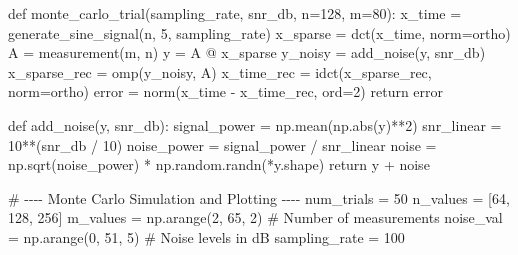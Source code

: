 \documentclass[
  letterpaper,
  DIV=11,
  numbers=noendperiod]{scrartcl}
\newenvironment{Shaded}{\begin{snugshade}}{\end{snugshade}}
\newcommand{\BuiltInTok}[1]{\textcolor[rgb]{0.40,0.85,0.94}{#1}}
\newcommand{\CommentTok}[1]{\textcolor[rgb]{0.46,0.44,0.37}{#1}}
\newcommand{\ControlFlowTok}[1]{\textcolor[rgb]{0.98,0.15,0.45}{#1}}
\newcommand{\DecValTok}[1]{\textcolor[rgb]{0.68,0.51,1.00}{#1}}
\newcommand{\KeywordTok}[1]{\textcolor[rgb]{0.98,0.15,0.45}{#1}}
\newcommand{\NormalTok}[1]{\textcolor[rgb]{0.97,0.97,0.95}{#1}}
\newcommand{\OperatorTok}[1]{\textcolor[rgb]{0.97,0.97,0.95}{#1}}
\newcommand{\StringTok}[1]{\textcolor[rgb]{0.90,0.86,0.45}{#1}}
\begin{document}
\begin{Shaded}
\begin{Highlighting}[]
\KeywordTok{def}\NormalTok{ monte\_carlo\_trial(sampling\_rate, snr\_db, n}\OperatorTok{=}\DecValTok{128}\NormalTok{, m}\OperatorTok{=}\DecValTok{80}\NormalTok{):}
\NormalTok{    x\_time }\OperatorTok{=}\NormalTok{ generate\_sine\_signal(n, }\DecValTok{5}\NormalTok{, sampling\_rate)}
\NormalTok{    x\_sparse }\OperatorTok{=}\NormalTok{ dct(x\_time, norm}\OperatorTok{=}\StringTok{\textquotesingle{}ortho\textquotesingle{}}\NormalTok{)}
\NormalTok{    A }\OperatorTok{=}\NormalTok{ measurement(m, n)}
\NormalTok{    y }\OperatorTok{=}\NormalTok{ A }\OperatorTok{@}\NormalTok{ x\_sparse}
\NormalTok{    y\_noisy }\OperatorTok{=}\NormalTok{ add\_noise(y, snr\_db)}
\NormalTok{    x\_sparse\_rec }\OperatorTok{=}\NormalTok{ omp(y\_noisy, A)}
\NormalTok{    x\_time\_rec }\OperatorTok{=}\NormalTok{ idct(x\_sparse\_rec, norm}\OperatorTok{=}\StringTok{\textquotesingle{}ortho\textquotesingle{}}\NormalTok{)}
\NormalTok{    error }\OperatorTok{=}\NormalTok{ norm(x\_time }\OperatorTok{{-}}\NormalTok{ x\_time\_rec, }\BuiltInTok{ord}\OperatorTok{=}\DecValTok{2}\NormalTok{)}
    \ControlFlowTok{return}\NormalTok{ error}

\KeywordTok{def}\NormalTok{ add\_noise(y, snr\_db):}
\NormalTok{    signal\_power }\OperatorTok{=}\NormalTok{ np.mean(np.}\BuiltInTok{abs}\NormalTok{(y)}\OperatorTok{**}\DecValTok{2}\NormalTok{)}
\NormalTok{    snr\_linear }\OperatorTok{=} \DecValTok{10}\OperatorTok{**}\NormalTok{(snr\_db }\OperatorTok{/} \DecValTok{10}\NormalTok{)}
\NormalTok{    noise\_power }\OperatorTok{=}\NormalTok{ signal\_power }\OperatorTok{/}\NormalTok{ snr\_linear}
\NormalTok{    noise }\OperatorTok{=}\NormalTok{ np.sqrt(noise\_power) }\OperatorTok{*}\NormalTok{ np.random.randn(}\OperatorTok{*}\NormalTok{y.shape)}
    \ControlFlowTok{return}\NormalTok{ y }\OperatorTok{+}\NormalTok{ noise}
    
\CommentTok{\# {-}{-}{-}{-} Monte Carlo Simulation and Plotting {-}{-}{-}{-}}
\NormalTok{num\_trials }\OperatorTok{=} \DecValTok{50}
\NormalTok{n\_values }\OperatorTok{=}\NormalTok{ [}\DecValTok{64}\NormalTok{, }\DecValTok{128}\NormalTok{, }\DecValTok{256}\NormalTok{]}
\NormalTok{m\_values }\OperatorTok{=}\NormalTok{ np.arange(}\DecValTok{2}\NormalTok{, }\DecValTok{65}\NormalTok{, }\DecValTok{2}\NormalTok{)  }\CommentTok{\# Number of measurements}
\NormalTok{noise\_val }\OperatorTok{=}\NormalTok{ np.arange(}\DecValTok{0}\NormalTok{, }\DecValTok{51}\NormalTok{, }\DecValTok{5}\NormalTok{)  }\CommentTok{\# Noise levels in dB}
\NormalTok{sampling\_rate }\OperatorTok{=} \DecValTok{100}


\end{Highlighting}
\end{Shaded}
\end{document}
